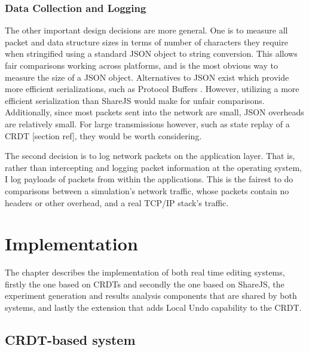 \documentclass[12pt,a4paper,twoside,openright]{report}
\begin{document}
	\subsection{Data Collection and Logging}
	
	
	The other important design decisions are more general. One is to measure all packet and data structure sizes in terms of number of characters they require when stringified using a standard JSON object to string conversion. This allows fair comparisons working across platforms, and is the most obvious way to measure the size of a JSON object. Alternatives to JSON exist which provide more efficient serializations, such as Protocol Buffers \cite{protobuf}. However, utilizing a more efficient serialization than ShareJS would make for unfair comparisons. Additionally, since most packets sent into the network are small, JSON overheads are relatively small. For large transmissions however, such as state replay of a CRDT [section ref], they would be worth considering.
	
	The second decision is to log network packets on the application layer. That is, rather than intercepting and logging packet information at the operating system, I log payloads of packets from within the applications. This is the fairest to do comparisons between a simulation's network traffic, whose packets contain no headers or other overhead, and a real TCP/IP stack's traffic.



\chapter{Implementation}

The chapter describes the implementation of both real time editing systems, firstly the one based on CRDTs and secondly the one based on ShareJS, the experiment generation and results analysis components that are shared by both systems, and lastly the extension that adds Local Undo capability to the CRDT.


\section{CRDT-based system}
\end{document}
